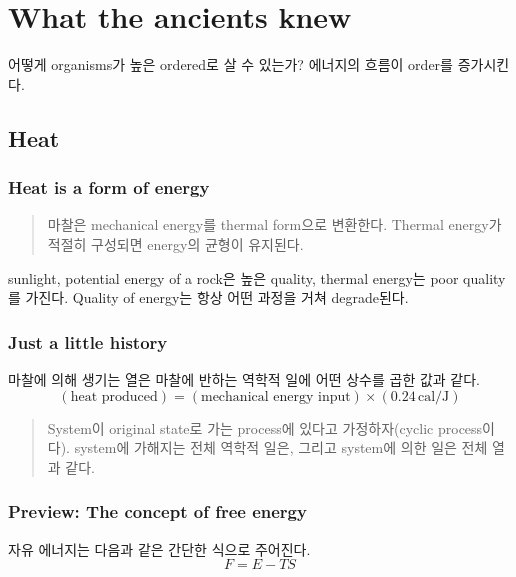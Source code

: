 %
%
%
\chapter{What the ancients knew}
어떻게 organisms가 높은 ordered로 살 수 있는가? 에너지의 흐름이 order를 증가시킨다.

\section{Heat}

\subsection{Heat is a form of energy}

\begin{quotation}
마찰은 mechanical energy를 thermal form으로 변환한다. Thermal energy가 적절히 구성되면 energy의 균형이 유지된다.
\end{quotation}

sunlight, potential energy of a rock은 높은 quality, thermal energy는 poor quality를 가진다. Quality of energy는 항상 어떤 과정을 거쳐 degrade된다.

\subsection{Just a little history}

마찰에 의해 생기는 열은 마찰에 반하는 역학적 일에 어떤 상수를 곱한 값과 같다.
\begin{equation}
	(\text{heat produced}) = (\text{mechanical energy input}) \times (0.24\,\mathrm{cal/J})
\end{equation}

\begin{quotation}
System이 original state로 가는 process에 있다고 가정하자(cyclic process이다). system에 가해지는 전체 역학적 일은, 그리고 system에 의한 일은 전체 열과 같다.
\end{quotation}

\subsection{Preview: The concept of free energy}
자유 에너지는 다음과 같은 간단한 식으로 주어진다.
\begin{equation}
	F = E - TS
\end{equation}

